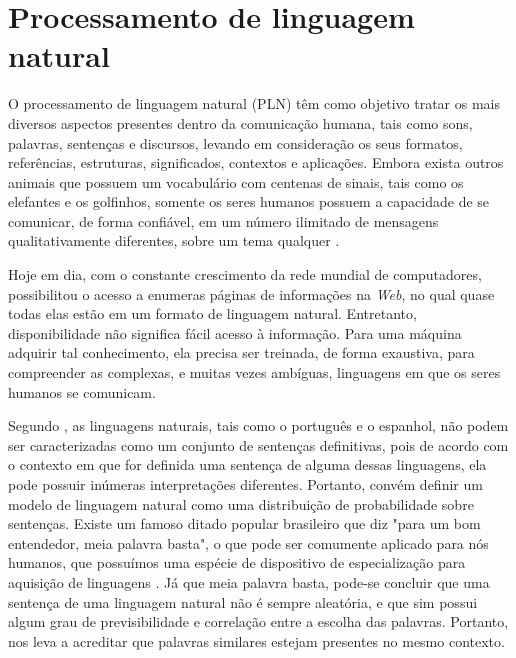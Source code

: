 \section{Processamento de linguagem natural}
O processamento de linguagem natural (PLN) têm como objetivo tratar os mais diversos aspectos presentes dentro da comunicação humana, tais como sons, palavras, sentenças e discursos, levando em consideração os seus formatos, referências, estruturas, significados, contextos e aplicações. Embora exista outros animais que possuem um vocabulário com centenas de sinais, tais como os elefantes e os golfinhos, somente os seres humanos possuem a capacidade de se comunicar, de forma confiável, em um número ilimitado de mensagens qualitativamente diferentes, sobre um tema qualquer \citep{russell1994inteligencia, gonzalez2003recuperaccao}.

Hoje em dia, com o constante crescimento da rede mundial de computadores, possibilitou o acesso a enumeras páginas de informações na \textit{Web}, no qual quase todas elas estão em um formato de linguagem natural. Entretanto, disponibilidade não significa fácil acesso à informação. Para uma máquina adquirir tal conhecimento, ela precisa ser treinada, de forma exaustiva, para compreender as complexas, e muitas vezes ambíguas, linguagens em que os seres humanos se comunicam.

Segundo \cite{russell1994inteligencia}, as linguagens naturais, tais como o português e o espanhol, não podem ser caracterizadas como um conjunto de sentenças definitivas, pois de acordo com o contexto em que for definida uma sentença de alguma dessas linguagens, ela pode possuir inúmeras interpretações diferentes. Portanto, convém definir um modelo de linguagem natural como uma distribuição de probabilidade sobre sentenças. Existe um famoso ditado popular brasileiro que diz "para um bom entendedor, meia palavra basta", o que pode ser comumente aplicado para nós humanos, que possuímos uma espécie de dispositivo de especialização para aquisição de linguagens \citep{chomsky2014aspects}. Já que meia palavra basta, pode-se concluir que uma sentença de uma linguagem natural não é sempre aleatória, e que sim possui algum grau de previsibilidade e correlação entre a escolha das palavras. Portanto, nos leva a acreditar que palavras similares estejam presentes no mesmo contexto.

